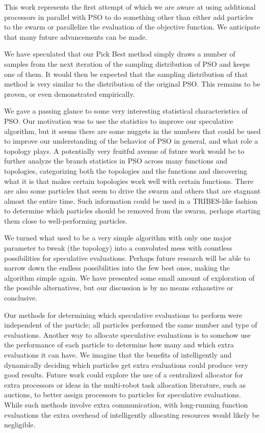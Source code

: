 \documentclass[journal,letterpaper]{IEEEtran}
\begin{document}
This work represents the first attempt of which we are aware at using
additional processors in parallel with PSO to do something other than either
add particles to the swarm or parallelize the evaluation of the objective
function.  We anticipate that many future advancements can be made.

We have speculated that our Pick Best method simply draws a number of samples
from the next iteration of the sampling distribution of PSO and keeps one of
them.  It would then be expected that the sampling distribution of that method
is very similar to the distribution of the original PSO.  This remains to be
proven, or even demonstrated empirically.

We gave a passing glance to some very interesting statistical characteristics
of PSO.  Our motivation was to use the statistics to improve our speculative
algorithm, but it seems there are some nuggets in the numbers that could be
used to improve our understanding of the behavior of PSO in general, and what
role a topology plays.  A potentially very fruitful avenue of future work would
be to further analyze the branch statistics in PSO across many functions and
topologies, categorizing both the topologies and the functions and discovering
what it is that makes certain topologies work well with certain functions.
There are also some particles that seem to drive the swarm and others that are
stagnant almost the entire time.  Such information could be used in a
TRIBES-like fashion to determine which particles should be removed from the
swarm, perhaps starting them close to well-performing particles.

We turned what used to be a very simple algorithm with only one major parameter
to tweak (the topology) into a convoluted mess with countless possibilities for
speculative evaluations.  Perhaps future research will be able to narrow down
the endless possibilities into the few best ones, making the algorithm simple
again.  We have presented some small amount of exploration of the possible
alternatives, but our discussion is by no means exhaustive or conclusive.

Our methods for determining which speculative evaluations to perform were
independent of the particle; all particles performed the same number and type
of evaluations.  Another way to allocate speculative evaluations is to somehow
use the performance of each particle to determine how many and which extra
evaluations it can have.  We imagine that the benefits of intelligently and
dynamically deciding which particles get extra evaluations could produce very
good results.  Future work could explore the use of a centralized allocator for
extra processors or ideas in the multi-robot task allocation literature, such
as auctions, to better assign processors to particles for speculative
evaluations.  While such methods involve extra communication, with long-running
function evaluations the extra overhead of intelligently allocating resources
would likely be negligible.
\end{document}
